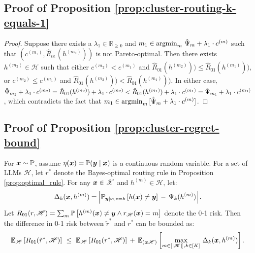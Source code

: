 \subsection{Proof of Proposition \ref{prop:cluster-routing-k-equals-1}}
\begin{proof}

Suppose there exists a $\lambda_1 \in \mathbb{R}_{\geq 0}$ and $m_1 \in \operatorname{argmin}_m \, \hat{\Psi}_{m}+\lambda_1\cdot c^{(m)}$ such that $(c^{(m_1)}, \hat{R}_{01}( h^{(m_1)}))$ is not Pareto-optimal. Then there exists $h^{(m_2)} \in \mathscr{H}$ such that either $c^{(m_2)} < c^{(m_1)}$ and $\hat{R}_{01}( h^{(m_2)})) \leq \hat{R}_{01}( h^{(m_1)}))$, or $c^{(m_2)} \leq c^{(m_1)}$ and $\hat{R}_{01}( h^{(m_2)})) < \hat{R}_{01}( h^{(m_1)}))$. In either case, $\hat{\Psi}_{m_2}+\lambda_1\cdot c^{(m_2)} = \hat{R}_{01}( h^{(m_2)}) +\lambda_1\cdot c^{(m_2)} < \hat{R}_{01}( h^{(m_1)}) +\lambda_1\cdot c^{(m_1)} = \hat{\Psi}_{m_1}+\lambda_1\cdot c^{(m_1)}$, which contradicts the fact that $m_1 \in \operatorname{argmin}_m\, [ \hat{\Psi}_{m}+\lambda_1\cdot c^{(m)} ]$. 
\end{proof}

\subsection{Proof of Proposition \ref{prop:cluster-regret-bound}}
\begin{prop*}[Restated]
For $\boldsymbol{x} \sim \mathbb{P}$, assume $\eta(\boldsymbol{x}) = \mathbb{P}(\boldsymbol{y} \mid \boldsymbol{x})$ is a continuous random variable. 
For a set of LLMs $\mathscr{H}$, 
let $r^*$ denote the Bayes-optimal routing rule in Proposition \ref{prop:optimal_rule}. 
For any $\boldsymbol{x} \in \mathscr{X}$ and $h^{(m)} \in \mathscr{H}$, let:
\begin{align*}
    \Delta_{k}(\boldsymbol{x}, h^{(m)}) = \left|\mathbb{P}_{\boldsymbol{y}|\boldsymbol{x},z=k}\left[h(\boldsymbol{x})\neq\boldsymbol{y}\right] \,-\, \Psi_{k}(h^{(m)}) \right|.
\end{align*}
Let $R_{01}(r,\mathscr{H}) = \sum_{m} \mathbb{P} \left[h^{(m)}(\boldsymbol{x})\neq\boldsymbol{y}\land r_{\mathscr{H}}(\boldsymbol{x})=m\right]$ denote the 0-1 risk.
Then the difference in 0-1 risk between $\tilde{r}^*$ and $r^*$ can be bounded as:
\begin{align*}
{\mathbb{E}_{\mathscr{H}}\left[R_{01}(\tilde{r}^*,\mathscr{H})\right] ~\leq~ \mathbb{E}_{\mathscr{H}}\left[{R}_{01}(r^*,\mathscr{H})\right]}  
 \,+\,
\mathbb{E}_{(\boldsymbol{x}\mathscr{H})}\left[\max_{m\in[|\mathscr{H}|], k\in[K]}\,\Delta_{k}(\boldsymbol{x}, h^{(m)})\right].
\end{align*}
\end{prop*}

